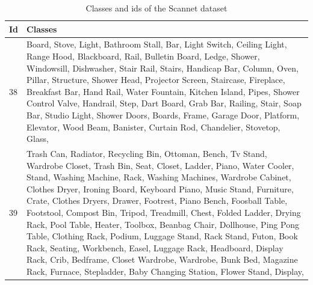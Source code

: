     \begin{table}
    	\begin{center}
    		\begin{tabular}{ | l | p{16cm} |}
    			\hline
    			
    			\cellcolor{purple!30}Id & \cellcolor{purple!30}Classes \\ \hline
    			38 & Board, Stove, Light, Bathroom Stall, Bar, Light Switch, Ceiling Light, Range Hood, Blackboard, Rail, Bulletin Board, Ledge, Shower, Windowsill, Dishwasher, Stair Rail, Stairs, Handicap Bar, Column, Oven, Pillar, Structure, Shower Head, Projector Screen, Staircase, Fireplace, Breakfast Bar, Hand Rail, Water Fountain, Kitchen Island, Pipes, Shower Control Valve, Handrail, Step, Dart Board, Grab Bar, Railing, Stair, Soap Bar, Studio Light, Shower Doors, Boards, Frame, Garage Door, Platform, Elevator, Wood Beam, Banister, Curtain Rod, Chandelier, Stovetop, Glass, \\ \hline
    			39 & Trash Can, Radiator, Recycling Bin, Ottoman, Bench, Tv Stand, Wardrobe Closet, Trash Bin, Seat, Closet, Ladder, Piano, Water Cooler, Stand, Washing Machine, Rack, Washing Machines, Wardrobe Cabinet, Clothes Dryer, Ironing Board, Keyboard Piano, Music Stand, Furniture, Crate, Clothes Dryers, Drawer, Footrest, Piano Bench, Foosball Table, Footstool, Compost Bin, Tripod, Treadmill, Chest, Folded Ladder, Drying Rack, Pool Table, Heater, Toolbox, Beanbag Chair, Dollhouse, Ping Pong Table, Clothing Rack, Podium, Luggage Stand, Rack Stand, Futon, Book Rack, Seating, Workbench, Easel, Luggage Rack, Headboard, Display Rack, Crib, Bedframe, Closet Wardrobe, Wardrobe, Bunk Bed, Magazine Rack, Furnace, Stepladder, Baby Changing Station, Flower Stand, Display, \\ \hline
    			\hline
    		\end{tabular}
    		\caption{Classes and ids of the Scannet dataset}
    		\label{table:Classes in scannet_2}
    	\end{center}
    \end{table}
    
